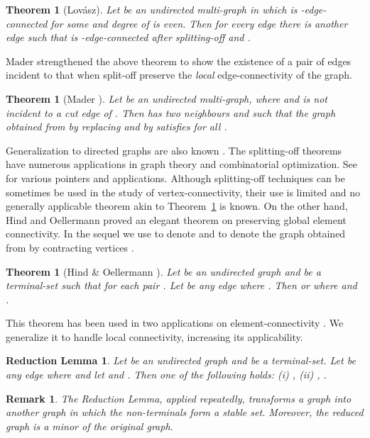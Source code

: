 \documentclass[11pt]{article}
\newtheorem{theorem}[lemma]{Theorem}
\newtheorem{remark}[lemma]{Remark}
\newtheorem*{redlem}{Reduction Lemma}
\begin{document}
\begin{theorem}[Lov\'{a}sz]
  Let  be an undirected multi-graph in which  is
  -edge-connected for some  and degree of  is
  even. Then for every edge  there is another edge  such that
   is -edge-connected after splitting-off  and .
\end{theorem}

Mader strengthened the above theorem to show the existence of
a pair of edges incident to  that when split-off preserve the
{\em local} edge-connectivity of the graph. 

\begin{theorem}[Mader \cite{Mader}]
  \label{thm:mader}
  Let  be an undirected multi-graph, where  and  is not incident to a cut edge of .  Then 
  has two neighbours  and  such that the graph  obtained
  from  by replacing  and  by  satisfies
   for all .
\end{theorem}

Generalization to directed graphs are also known
\cite{Mader,Frank,Jackson}. The splitting-off theorems have numerous
applications in graph theory and combinatorial optimization. See
\cite{Lovasz,Frank92,Kriesell,JainMS03,ChekuriS,Lau1,Lau2,LauK} for
various pointers and applications.  Although splitting-off techniques
can be sometimes be used in the study of vertex-connectivity, their
use is limited and no generally applicable theorem akin to
Theorem~\ref{thm:mader} is known. On the other hand, Hind and
Oellermann \cite{hind} proved an elegant theorem on preserving global
element connectivity. In the sequel we use  to denote
 and  to denote the graph
obtained from  by contracting vertices .

\begin{theorem}[Hind \& Oellermann \cite{hind}]
  \label{thm:ho}
  Let  be an undirected graph and  be a terminal-set
  such that  for each pair . 
  Let  be {\em any} edge where . Then
   or  where 
  and . 
\end{theorem}

This theorem has been used in two applications on element-connectivity
\cite{cs,LauK}. We generalize it to handle local connectivity,
increasing its applicability. 

\begin{redlem} \label{lem:reduction}
  Let  be an undirected graph and  be a terminal-set.
  Let  be {\em any} edge where  and
  let  and . Then one of the following holds:
  (i) ,  
  (ii) , .
\end{redlem}

\begin{remark}
  The Reduction Lemma, applied repeatedly, transforms a graph
  into another graph in which the non-terminals form a stable set. Moreover,
  the reduced graph is a minor of the original graph.
\end{remark}
\end{document}
